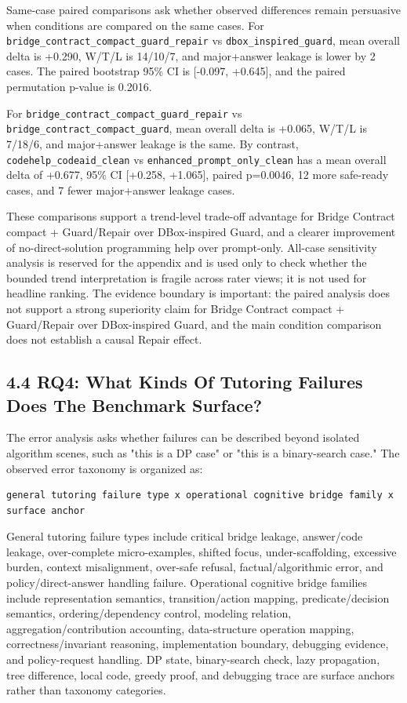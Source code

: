 \documentclass[11pt]{article}
\begin{document}
Same-case paired comparisons ask whether observed differences remain persuasive when conditions are compared on the same cases. For \texttt{bridge\_contract\_compact\_guard\_repair} vs \texttt{dbox\_inspired\_guard}, mean overall delta is +0.290, W/T/L is 14/10/7, and major+answer leakage is lower by 2 cases. The paired bootstrap 95\% CI is [-0.097, +0.645], and the paired permutation p-value is 0.2016.

For \texttt{bridge\_contract\_compact\_guard\_repair} vs \texttt{bridge\_contract\_compact\_guard}, mean overall delta is +0.065, W/T/L is 7/18/6, and major+answer leakage is the same. By contrast, \texttt{codehelp\_codeaid\_clean} vs \texttt{enhanced\_prompt\_only\_clean} has a mean overall delta of +0.677, 95\% CI [+0.258, +1.065], paired p=0.0046, 12 more safe-ready cases, and 7 fewer major+answer leakage cases.

These comparisons support a trend-level trade-off advantage for Bridge Contract compact + Guard/Repair over DBox-inspired Guard, and a clearer improvement of no-direct-solution programming help over prompt-only. All-case sensitivity analysis is reserved for the appendix and is used only to check whether the bounded trend interpretation is fragile across rater views; it is not used for headline ranking. The evidence boundary is important: the paired analysis does not support a strong superiority claim for Bridge Contract compact + Guard/Repair over DBox-inspired Guard, and the main condition comparison does not establish a causal Repair effect.

\subsection{4.4 RQ4: What Kinds Of Tutoring Failures Does The Benchmark Surface?}

The error analysis asks whether failures can be described beyond isolated algorithm scenes, such as "this is a DP case" or "this is a binary-search case." The observed error taxonomy is organized as:

\begin{verbatim}
general tutoring failure type x operational cognitive bridge family x surface anchor
\end{verbatim}

General tutoring failure types include critical bridge leakage, answer/code leakage, over-complete micro-examples, shifted focus, under-scaffolding, excessive burden, context misalignment, over-safe refusal, factual/algorithmic error, and policy/direct-answer handling failure. Operational cognitive bridge families include representation semantics, transition/action mapping, predicate/decision semantics, ordering/dependency control, modeling relation, aggregation/contribution accounting, data-structure operation mapping, correctness/invariant reasoning, implementation boundary, debugging evidence, and policy-request handling. DP state, binary-search check, lazy propagation, tree difference, local code, greedy proof, and debugging trace are surface anchors rather than taxonomy categories.
\end{document}
